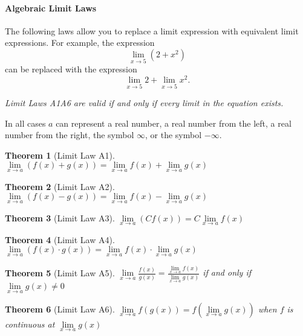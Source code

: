 \documentclass[12pt,]{book}
\theoremstyle{plain}
\newtheorem{theorem}{Theorem}[section]
\theoremstyle{definition}
\theoremstyle{definition}
\theoremstyle{definition}
\theoremstyle{definition}
\theoremstyle{definition}
\numberwithin{equation}{section}
\newcommand{\fe}[2]{#1\mathopen{}\left(#2\right)\mathclose{}}
\begin{document}
\paragraph[{Algebraic Limit Laws}]{Algebraic Limit Laws}\hypertarget{paragraphs-22}{}
The following laws allow you to replace a limit expression with equivalent limit expressions. For example, the expression \begin{equation*}\lim\limits_{x\to5}\left(2+x^2\right)\end{equation*} can be replaced with the expression \begin{equation*}\lim\limits_{x\to5}2+\lim\limits_{x\to5}x^2\text{.}\end{equation*}%
\par
\emph{Limit Laws A1\textendash{}A6 are valid if and only if every limit in the equation exists.}%
\par
In all cases \(a\) can represent a real number, a real number from the left, a real number from the right, the symbol \(\infty\), or the symbol \(-\infty\).%
\begin{theorem}[{Limit Law A1}]\label{lla1}
\(\lim\limits_{x\to a}\left(\fe{f}{x}+\fe{g}{x}\right)=\lim\limits_{x\to a}\fe{f}{x}+\lim\limits_{x\to a}\fe{g}{x}\)%
\end{theorem}
\begin{theorem}[{Limit Law A2}]\label{lla2}
\(\lim\limits_{x\to a}\left(\fe{f}{x}-\fe{g}{x}\right)=\lim\limits_{x\to a}\fe{f}{x}-\lim\limits_{x\to a}\fe{g}{x}\)%
\end{theorem}
\begin{theorem}[{Limit Law A3}]\label{lla3}
\(\lim\limits_{x\to a}\left(C\fe{f}{x}\right)=C\lim\limits_{x\to a}\fe{f}{x}\)%
\end{theorem}
\begin{theorem}[{Limit Law A4}]\label{lla4}
\(\lim\limits_{x\to a}\left(\fe{f}{x}\cdot\fe{g}{x}\right)=\lim\limits_{x\to a}\fe{f}{x}\cdot\lim\limits_{x\to a}\fe{g}{x}\)%
\end{theorem}
\begin{theorem}[{Limit Law A5}]\label{lla5}
\(\lim\limits_{x\to a}\frac{\fe{f}{x}}{\fe{g}{x}}=\frac{\lim\limits_{x\to a}\fe{f}{x}}{\lim\limits_{x\to a}\fe{g}{x}}\) if and only if \(\lim\limits_{x\to a}\fe{g}{x}\neq0\)%
\end{theorem}
\begin{theorem}[{Limit Law A6}]\label{lla6}
\(\lim\limits_{x\to a}\fe{f}{\fe{g}{x}}=\fe{f}{\lim\limits_{x\to a}\fe{g}{x}}\) when \(f\) is continuous at \(\lim\limits_{x\to a}\fe{g}{x}\)%
\end{theorem}
\end{document}
